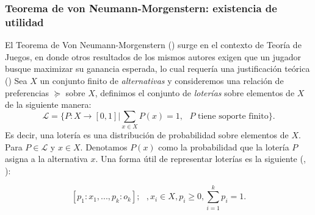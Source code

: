 \documentclass[11pt]{article}
\theoremstyle{plain}
\begin{document}
		\subsubsection{Teorema de von Neumann-Morgenstern: existencia de utilidad}
		El Teorema de Von Neumann-Morgenstern (\cite{von1944theory}) surge en el contexto de Teoría de Juegos, en donde otros resultados de los mismos autores exigen que un jugador busque maximizar su ganancia esperada, lo cual requería una justificación teórica (\cite{gilboa2009decision})
		Sea $X$ un conjunto finito de \textit{alternativas} y consideremos una relación de preferencias $\succeq$ sobre $X$, definimos el conjunto de \textit{loterías} sobre elementos de $X$ de la siguiente manera:
\[ \mathcal{L} = \{ P:X \to [0,1] | \sum_{x \in X} P(x) = 1, \textrm{ $P$ tiene soporte finito} \}. \]
Es decir, una lotería es una distribución de probabilidad sobre elementos de $X$. Para $P \in \mathcal{L}$ y $x \in X$. Denotamos $P(x)$ como la probabilidad que la lotería $P$ asigna a la alternativa $x$. Una forma útil de representar loterías es la siguiente (\cite{sucar2015probabilistic}, \cite{shoham2008multiagent}):

\[ [p_1: x_1, ... , p_k : o_k]; \textrm{  }, x_i \in X, p_i \geq 0, \sum_{i=1}^k  p_i = 1.\]
\end{document}
